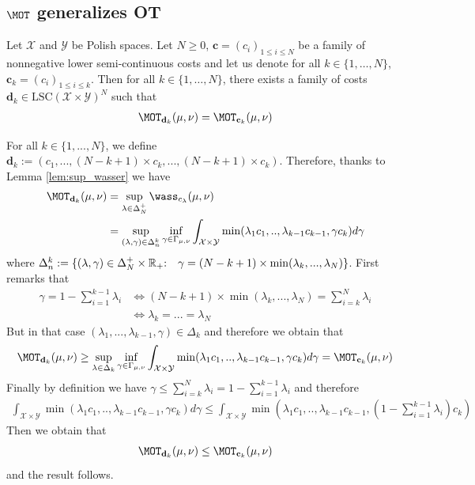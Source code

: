 \subsection{$\MOT$ generalizes OT}
\label{sec:MOT-gene}
\begin{prop}
\label{prop:gene-GOT}
Let $\mathcal{X}$ and $\mathcal{Y}$ be Polish spaces. Let $N\geq 0$, $\mathbf{c}=(c_i)_{1\leq i\leq N}$ be a family of nonnegative lower semi-continuous costs and let us denote for all $k\in\{1,\dots,N\}$, $\mathbf{c}_k=(c_i)_{1\leq i\leq k}$. Then for all $k\in\{1,\dots,N\}$, there exists a family of costs $\mathbf{d}_k\in\text{LSC}(\mathcal{X}\times\mathcal{Y})^N$ such that  
\begin{align}
    \MOT_{\mathbf{d}_k}(\mu,\nu) = \MOT_{\mathbf{c}_k}(\mu,\nu)
\end{align}
\end{prop}
\begin{prv*}
For all $k\in\{1,...,N\}$, we define $\mathbf{d}_k:=(c_1,...,(N-k+1)\times c_k,...,(N-k+1)\times c_k)$. Therefore, thanks to Lemma \ref{lem:sup_wasser} we have
\begin{align}
\MOT_{\mathbf{d}_k}(\mu,\nu)& = \sup_{\lambda\in\Delta_N^{+}} \wass_{c_\lambda}(\mu,\nu) \\
& = \sup_{(\lambda,\gamma)\in\Delta^k_n} \inf_{\gamma\in\Gamma_{\mu,\nu}}\int_{\mathcal{X}\times\mathcal{Y}} \min(\lambda_1 c_1,..,\lambda_{k-1}c_{k-1},\gamma c_k) d\gamma
\end{align}
where $\Delta^k_n:=\{(\lambda,\gamma)\in \Delta_N^{+}\times\mathbb{R}_{+}\text{:\quad } \gamma=(N-k+1)\times\min(\lambda_k,...,\lambda_N)\}$.
First remarks that
\begin{align}
    \gamma = 1 - \sum_{i=1}^{k-1} \lambda_i &\iff (N-k+1)\times\min(\lambda_k,...,\lambda_N) = \sum_{i=k}^{N} \lambda_i \\
    &\iff \lambda_k=...=\lambda_N
\end{align}
But in that case $(\lambda_1,...,\lambda_{k-1},\gamma)\in\Delta_k$ and therefore we obtain that 
\begin{align*}
     \MOT_{\mathbf{d}_k}(\mu,\nu) \geq \sup_{\lambda\in\Delta_k}\inf_{\gamma\in\Gamma_{\mu,\nu}}  \int_{\mathcal{X}\times\mathcal{Y}} \min(\lambda_1 c_1,..,\lambda_{k-1}c_{k-1},\gamma c_k) d\gamma = \MOT_{\mathbf{c}_k}(\mu,\nu) 
\end{align*}
Finally by definition we have  $\gamma\leq \sum_{i=k}^{N} \lambda_i = 1 -  \sum_{i=1}^{k-1} \lambda_i $ and therefore
\begin{align*}
 \int_{\mathcal{X}\times\mathcal{Y}} \min(\lambda_1 c_1,..,\lambda_{k-1}c_{k-1},\gamma c_k) d\gamma \leq  \int_{\mathcal{X}\times\mathcal{Y}} \min\left(\lambda_1 c_1,..,\lambda_{k-1}c_{k-1},\left(1 -  \sum_{i=1}^{k-1} \lambda_i\right) c_k\right) 
\end{align*}
Then we obtain that 
\begin{align*}
     \MOT_{\mathbf{d}_k}(\mu,\nu)\leq  \MOT_{\mathbf{c}_k}(\mu,\nu) 
\end{align*}
and the result follows.
\end{prv*}

